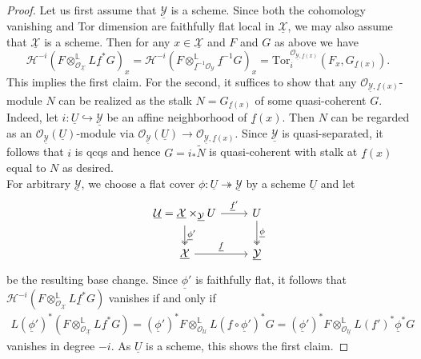 \documentclass[11pt]{amsart}
\theoremstyle{definition}
\theoremstyle{definition}
\newcommand{\ul}[1]{\underline{#1}}
\begin{document}
\begin{proof}
    Let us first assume that $\ul{\mathcal{Y}}$ is a scheme. Since both the cohomology vanishing and Tor dimension are faithfully flat local in $\ul{\mathcal{X}}$, we may also assume that $\ul{\mathcal{X}}$ is a scheme. Then for any $x\in \ul{\mathcal{X}}$ and $F$ and $G$ as above we have 
    $$
    \mathcal{H}^{-i}(F\otimes_{\mathcal{O}_{\ul{\mathcal{X}}}}^\mathbb{L} L\ul{f}^*G)_x = \mathcal{H}^{-i}(F\otimes_{\ul{f}^{-1}\mathcal{O}_\mathcal{Y}}^\mathbb{L} \ul{f}^{-1} G)_x = \text{Tor}_i^{\mathcal{O}_{\ul{\mathcal{Y}},\ul{f}(x)}}(F_x,G_{\ul{f}(x)}).$$
    This implies the first claim. For the second, it suffices to show that any $\mathcal{O}_{\ul{\mathcal{Y}},\ul{f}(x)}$-module $N$ can be realized as the stalk $N=G_{\ul{f}(x)}$ of some quasi-coherent $G$. Indeed, let $i\colon \ul{U}\hookrightarrow \ul{\mathcal{Y}}$ be an affine neighborhood of $\underline{f}(x)$. Then $N$ can be regarded as an $\mathcal{O}_{\ul{\mathcal{Y}}}(\ul{U})$-module via $\mathcal{O}_{\ul{\mathcal{Y}}}(\ul{U})\rightarrow \mathcal{O}_{\ul{\mathcal{Y}},\ul{f}(x)}$. Since $\ul{\mathcal{Y}}$ is quasi-separated, it follows that $i$ is qcqs and hence $G= i_*\widetilde{N}$ is quasi-coherent with stalk at $\ul{f}(x)$ equal to $N$ as desired.\\
    For arbitrary $\ul{\mathcal{Y}}$, we choose a flat cover $\phi\colon \ul{U}\twoheadrightarrow \ul{\mathcal{Y}}$ by a scheme $\ul{U}$ and let 
    \begin{equation*}
    \begin{tikzcd}
        \ul{\mathcal{U}} = \ul{\mathcal{X}}\times_{\ul{\mathcal{Y}}}\dar[two heads, "\ul{\phi}'"] U\rar["\underline{f}'"] & U\dar[two heads, "\ul{\phi}"]\\
        \underline{\mathcal{X}}\rar["\underline{f}"]&\underline{\mathcal{Y}}
    \end{tikzcd}
    \end{equation*}
    be the resulting base change. Since $\underline{\phi}'$ is faithfully flat, it follows that $\mathcal{H}^{-i}(F\otimes_{\mathcal{O}_{\ul{\mathcal{X}}}}^\mathbb{L} L\ul{f}^*G)$ vanishes if and only if 
    \begin{align}\label{blablashit}
        L(\ul{\phi}')^*(F\otimes^{\mathbb{L}}_{\mathcal{O}_{\ul{\mathcal{X}}}} L\ul{f}^*G) = (\ul{\phi}')^*F \otimes_{\mathcal{O}_{\mathcal{U}}}^\mathbb{L} L(\ul{f}\circ \ul{\phi}')^* G = (\ul{\phi}')^*F \otimes_{\mathcal{O}_{\ul{\mathcal{U}}}}^\mathbb{L} L(\ul{f}')^*\ul{\phi}^* G
    \end{align}
    vanishes in degree $-i$. As $\ul{U}$ is a scheme, this shows the first claim.
    

\end{proof}
\end{document}

